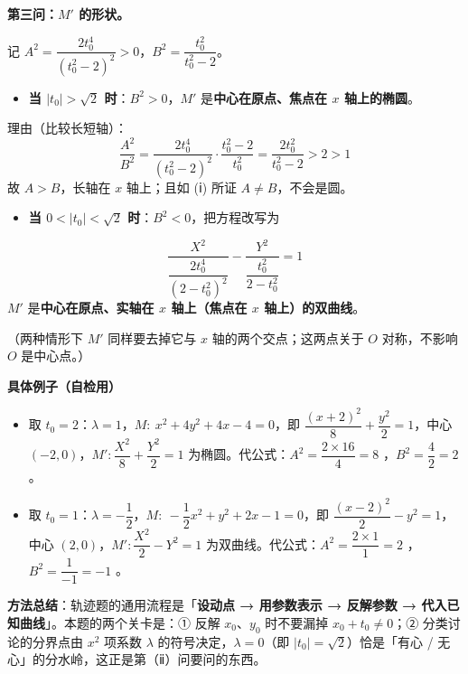 \begin{answer}
\textbf{第三问：$M'$ 的形状。}

记 $A^2=\dfrac{2t_0^4}{\left(t_0^2-2\right)^2}>0$，$B^2=\dfrac{t_0^2}{t_0^2-2}$。

\begin{itemize}
\item \textbf{当 $\left|t_0\right|>\sqrt2$ 时}：$B^2>0$，$M'$ 是\textbf{中心在原点、焦点在 $x$ 轴上的椭圆}。
\end{itemize}
  理由（比较长短轴）：
\nopagebreak[4]
\[\frac{A^2}{B^2}=\frac{2t_0^4}{\left(t_0^2-2\right)^2}\cdot\frac{t_0^2-2}{t_0^2}=\frac{2t_0^2}{t_0^2-2}>2>1\]
  故 $A>B$，长轴在 $x$ 轴上；且如 (ⅰ) 所证 $A\ne B$，不会是圆。
\begin{itemize}
\item \textbf{当 $0<\left|t_0\right|<\sqrt2$ 时}：$B^2<0$，把方程改写为
\end{itemize}
\nopagebreak[4]
\[\frac{X^2}{\dfrac{2t_0^4}{\left(2-t_0^2\right)^2}}-\frac{Y^2}{\dfrac{t_0^2}{2-t_0^2}}=1\]
  $M'$ 是\textbf{中心在原点、实轴在 $x$ 轴上（焦点在 $x$ 轴上）的双曲线}。

（两种情形下 $M'$ 同样要去掉它与 $x$ 轴的两个交点；这两点关于 $O$ 对称，不影响 $O$ 是中心点。）

\begin{gktip}
\textbf{具体例子（自检用）}
\begin{itemize}
\item 取 $t_0=2$：$\lambda=1$，$M:\ x^2+4y^2+4x-4=0$，即 $\dfrac{(x+2)^2}{8}+\dfrac{y^2}{2}=1$，中心 $(-2,0)$，$M':\dfrac{X^2}{8}+\dfrac{Y^2}{2}=1$ 为椭圆。代公式：$A^2=\dfrac{2\times16}{4}=8$ ，$B^2=\dfrac{4}{2}=2$ 。
\item 取 $t_0=1$：$\lambda=-\dfrac12$，$M:\ -\dfrac12x^2+y^2+2x-1=0$，即 $\dfrac{(x-2)^2}{2}-y^2=1$，中心 $(2,0)$，$M':\dfrac{X^2}{2}-Y^2=1$ 为双曲线。代公式：$A^2=\dfrac{2\times1}{1}=2$ ，$B^2=\dfrac{1}{-1}=-1$ 。
\end{itemize}

\textbf{方法总结}：轨迹题的通用流程是「\textbf{设动点 → 用参数表示 → 反解参数 → 代入已知曲线}」。本题的两个关卡是：① 反解 $x_0$、$y_0$ 时不要漏掉 $x_0+t_0\ne0$；② 分类讨论的分界点由 $x^2$ 项系数 $\lambda$ 的符号决定，$\lambda=0$（即 $\left|t_0\right|=\sqrt2$）恰是「有心 / 无心」的分水岭，这正是第（ⅱ）问要问的东西。
\end{gktip}



\par\medskip

\end{answer}
